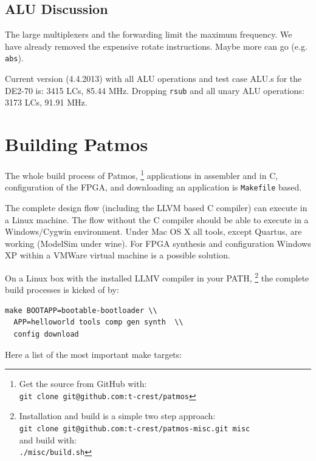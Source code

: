 \documentclass{IEEEtran}
\newcommand{\code}[1]{{\texttt{#1}}}
\begin{document}
\subsection{ALU Discussion}

The large multiplexers and the forwarding limit the maximum frequency.
We have already removed the expensive rotate instructions. Maybe more
can go (e.g. \code{abs}).

Current version (4.4.2013) with all ALU operations and test case ALU.s
for the DE2-70 is: 3415 LCs, 85.44 MHz. Dropping \code{rsub} and all unary
ALU operations: 3173 LCs, 91.91 MHz.

\section{Building Patmos}

The whole build process of Patmos,
\footnote{Get the source from GitHub with:\\
\code{git clone git@github.com:t-crest/patmos}}
applications in assembler
and in C, configuration of the FPGA, and downloading an application
is \code{Makefile} based.

The complete design flow (including the LLVM
based C compiler) can execute in a Linux machine. The flow without
the C compiler should be able to execute in a Windows/Cygwin environment.
Under Mac OS X all tools, except Quartus, are working (ModelSim under
wine). For FPGA synthesis and configuration Windows XP within a VMWare
virtual machine is a possible solution.

On a Linux box with the installed LLMV compiler in your PATH,
\footnote{Installation and build is a simple two step approach:\\
\code{git clone git@github.com:t-crest/patmos-misc.git misc}\\
and build with:\\
\code{./misc/build.sh}}
the complete build processes is kicked of by:

\begin{verbatim}
make BOOTAPP=bootable-bootloader \\
  APP=helloworld tools comp gen synth  \\
  config download
\end{verbatim}

Here a list of the most important make targets:
\end{document}
